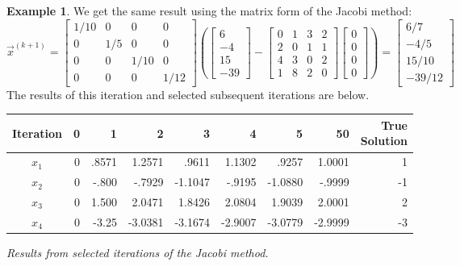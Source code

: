\documentclass[12pt,letterpaper]{article}
\theoremstyle{definition}
\newtheorem{example}[thm]{Example}
\begin{document}
\begin{example}
We get the same result using the matrix form of the Jacobi method:
\begin{equation*}
    \vec{x}^{(k+1)} = \begin{bmatrix}1/10&0&0&0\\0&1/5&0&0\\0&0&1/10&0\\0&0&0&1/12
    \end{bmatrix}\left(\begin{bmatrix}6\\-4\\15\\-39\end{bmatrix}- \begin{bmatrix}
    0 & 1 & 3 & 2\\
    2 & 0 & 1 & 1\\
    4 & 3 & 0 & 2\\
    1 & 8 & 2 & 0
    \end{bmatrix}\begin{bmatrix}
0\\0\\0\\0
\end{bmatrix}\right)=\begin{bmatrix}
6/7\\-4/5\\15/10\\-39/12
\end{bmatrix}
\end{equation*}
The results of this iteration and selected subsequent iterations are below.\\

\begin{tabular}{crrrrrrrr}
     \toprule
    Iteration & 0 & 1 & 2 & 3 & 4 & 5 & 50 & True Solution \\
    \midrule
    $x_1$ & 0 & .8571 & 1.2571 & .9611 & 1.1302 & .9257 & 1.0001 & 1\\
    $x_2$ & 0 & -.800 & -.7929 & -1.1047 & -.9195 & -1.0880 & -.9999 & -1\\
    $x_3$ & 0 & 1.500 & 2.0471 & 1.8426 & 2.0804 & 1.9039 & 2.0001 & 2\\
    $x_4$ & 0 & -3.25 & -3.0381 & -3.1674 & -2.9007 & -3.0779 & -2.9999 & -3\\
    \bottomrule
\end{tabular}
\begin{center}
    \it Results from selected iterations of the Jacobi method.
\end{center}
\end{example}
\end{document}
